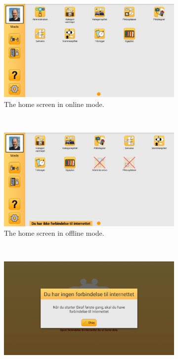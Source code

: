 \begin{figure}[!htb]
    \centering
    \begin{subfigure}[t]{0.47\textwidth}
        \includegraphics[width=\textwidth]{figures/img/screenshots/reg_homescreen.png}
        \caption{The home screen in online mode.}\label{fig:online_homescreen}
    \end{subfigure}%
    ~
    \begin{subfigure}[t]{0.47\textwidth}
        \includegraphics[width=\textwidth]{figures/img/screenshots/offline_homescreen.png}
        \caption{The home screen in offline mode.}\label{fig:offline_homescreen}
    \end{subfigure}
    \\
    \begin{subfigure}[t]{0.47\textwidth}
        \includegraphics[width=\textwidth]{figures/img/screenshots/offline_initstart.png}

\end{subfigure}
\end{figure}
